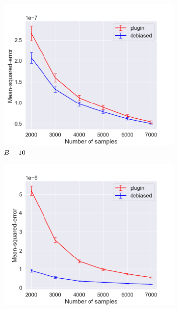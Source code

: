 \begin{figure}
  \centering
  \centering
     \begin{subfigure}[b]{0.48\textwidth}
         \centering
         \includegraphics[width=\textwidth]{images/mse_estimator_10_bins.png}
         \caption{$B = 10$
         }
         \label{fig:mse_estimators}
     \end{subfigure}
     \hfill
     \begin{subfigure}[b]{0.48\textwidth}
         \centering
         \includegraphics[width=\textwidth]{images/mse_estimator_100_bins.png}

\end{subfigure}
\end{figure}
